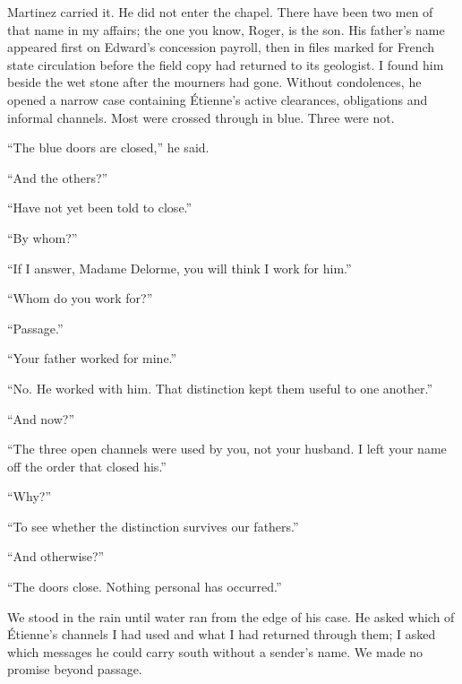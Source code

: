 \ornament

Martinez carried it. He did not enter the chapel. There have been two men of that name in my affairs; the one you know, Roger, is the son. His father's name appeared first on Edward's concession payroll, then in files marked for French state circulation before the field copy had returned to its geologist. I found him beside the wet stone after the mourners had gone. Without condolences, he opened a narrow case containing Étienne's active clearances, obligations and informal channels. Most were crossed through in blue. Three were not.\par

“The blue doors are closed,” he said.\par

“And the others?”\par

“Have not yet been told to close.”\par

“By whom?”\par

“If I answer, Madame Delorme, you will think I work for him.”\par

“Whom do you work for?”\par

“Passage.”\par

“Your father worked for mine.”\par

“No. He worked with him. That distinction kept them useful to one another.”\par

“And now?”\par

“The three open channels were used by you, not your husband. I left your name off the order that closed his.”\par

“Why?”\par

“To see whether the distinction survives our fathers.”\par

“And otherwise?”\par

“The doors close. Nothing personal has occurred.”\par

We stood in the rain until water ran from the edge of his case. He asked which of Étienne's channels I had used and what I had returned through them; I asked which messages he could carry south without a sender's name. We made no promise beyond passage.\par

